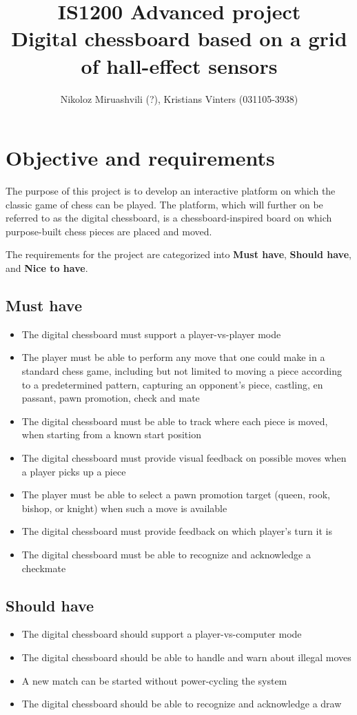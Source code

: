 \documentclass{article}
\title{IS1200 \textbf{Advanced} project\\Digital chessboard based on a grid of hall-effect sensors}
\author{Nikoloz Miruashvili (?), Kristians Vinters (031105-3938)}
\begin{document}
\maketitle

\section{Objective and requirements}

The purpose of this project is to develop an interactive platform on which the classic game of chess can be played. The platform, which will further on be referred to as the digital chessboard, is a chessboard-inspired board on which purpose-built chess pieces are placed and moved.

The requirements for the project are categorized into \textbf{Must have}, \textbf{Should have}, and \textbf{Nice to have}.

\subsection*{Must have}
\begin{itemize}
	\item The digital chessboard must support a player-vs-player mode
	\item The player must be able to perform any move that one could make in a standard chess game, including but not limited to moving a piece according to a predetermined pattern, capturing an opponent's piece, castling, en passant, pawn promotion, check and mate
	\item The digital chessboard must be able to track where each piece is moved, when starting from a known start position
	\item The digital chessboard must provide visual feedback on possible moves when a player picks up a piece
	\item The player must be able to select a pawn promotion target (queen, rook, bishop, or knight) when such a move is available
	\item The digital chessboard must provide feedback on which player's turn it is
	\item The digital chessboard must be able to recognize and acknowledge a checkmate
\end{itemize}

\subsection*{Should have}
\begin{itemize}
	\item The digital chessboard should support a player-vs-computer mode
	\item The digital chessboard should be able to handle and warn about illegal moves
	\item A new match can be started without power-cycling the system
	\item The digital chessboard should be able to recognize and acknowledge a draw
\end{itemize}
\end{document}
